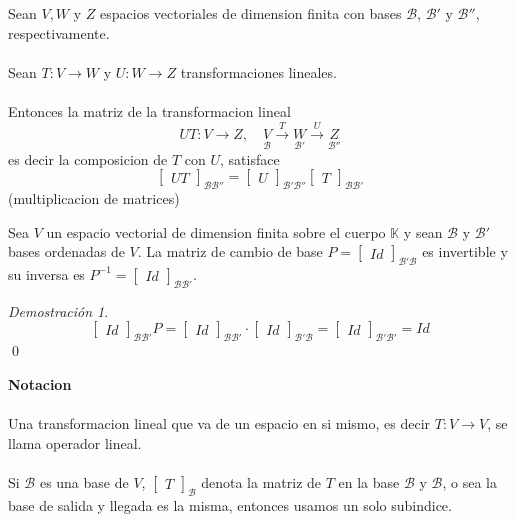 \documentclass{article}
\theoremstyle{definition}
\theoremstyle{definition}
\theoremstyle{remark}
\newtheorem*{demo}{Demostración}
\begin{document}
\begin{teo}
Sean $V,W$ y $Z$ espacios vectoriales de dimension finita con bases $\mathcal{B}$, $\mathcal{B'}$ y $\mathcal{B''}$, respectivamente. \\\\
Sean $T: V \to W$ y $U : W \to Z$ transformaciones lineales. \\\\ Entonces la matriz de la transformacion lineal \[
  UT : V \to Z, \quad \underset{\mathcal{B}}{V} \overset{T}{\to} \underset{\mathcal{B'}}{W} \overset{U}{\to}\underset{\mathcal{B''}}{Z}
\]
es decir la composicion de $T$ con $U$, satisface \[
  \begin{bmatrix}UT\end{bmatrix}_{\mathcal{B}{\mathcal{B''}}}=\begin{bmatrix}U\end{bmatrix}_{\mathcal{B'}\mathcal{B''}}\begin{bmatrix}T\end{bmatrix}_{\mathcal{B}\mathcal{B'}}
\]
(multiplicacion de matrices)
\end{teo} 
\begin{corol}
  Sea $V$ un espacio vectorial de dimension finita sobre el cuerpo $\mathbb{K}$ y sean $\mathcal{B}$ y $\mathcal{B'}$ bases ordenadas de $V$. La matriz de cambio de base $P=\begin{bmatrix}Id\end{bmatrix}_{\mathcal{B}'\mathcal{B}}$ es invertible y su inversa es $P^{-1}=\begin{bmatrix}Id\end{bmatrix}_{\mathcal{B}\mathcal{B'}}$.
\end{corol}
\begin{demo}
  \[
    \begin{bmatrix}Id\end{bmatrix}_{\mathcal{B}\mathcal{B'}} P = \begin{bmatrix}Id\end{bmatrix}_{\mathcal{B}\mathcal{B'}} \cdot \begin{bmatrix}Id \end{bmatrix}_{\mathcal{B'}\mathcal{B}}=\begin{bmatrix}Id\end{bmatrix}_{\mathcal{B'}\mathcal{B'}}=Id
  \]
  \qed
\end{demo}
\textbf{Notacion}\\\\ Una transformacion lineal que va de un espacio en si mismo, es decir $T: V \to V$, se llama operador lineal. \\\\ Si $\mathcal{B}$ es una base de $V$, $\begin{bmatrix}T\end{bmatrix}_{\mathcal{B}}$ denota la matriz de $T$ en la base $\mathcal{B}$ y $\mathcal{B}$, o sea la base de salida y llegada es la misma, entonces usamos un solo subindice.
\end{document}
